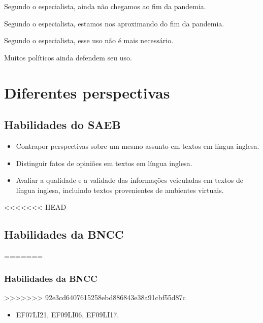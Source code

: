 \begin{escolha}
\item Segundo o especialista, ainda não chegamos ao fim da pandemia.

\item Segundo o especialista, estamos nos aproximando do fim da pandemia.

\item Segundo o especialista, esse uso não é mais necessário.

\item Muitos políticos ainda defendem seu uso.
\end{escolha}

\chapter{Diferentes perspectivas}


\section{Habilidades do SAEB}

\begin{itemize}
\item Contrapor perspectivas sobre um mesmo assunto em textos em língua
inglesa.

\item Distinguir fatos de opiniões em textos em língua inglesa.

\item Avaliar a qualidade e a validade das informações veiculadas em textos
de língua inglesa, incluindo textos provenientes de ambientes virtuais.
\end{itemize}

<<<<<<< HEAD
\section{Habilidades da BNCC}
=======
\subsection{Habilidades da BNCC}
>>>>>>> 92e3cd6407615258ebd886843e38a91cbf55d87c

\begin{itemize}
	\item EF07LI21, EF09LI06, EF09LI17.
\end{itemize}

